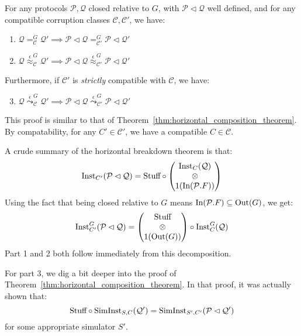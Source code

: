 \begin{theorem}
  For any protocols $\mathcal{P}, \mathcal{Q}$ closed relative to $G$, with $\mathcal{P} \lhd \mathcal{Q}$
  well defined, and for any compatible corruption classes $\mathcal{C}, \mathcal{C'}$, we have:
  \begin{enumerate}
    \item $\mathcal{Q} =^G_{\mathcal{C}} \mathcal{Q}' \implies \mathcal{P} \lhd \mathcal{Q} =^G_{\mathcal{C}'} \mathcal{P} \lhd \mathcal{Q}'$
    \item $\mathcal{Q} \overset{\epsilon}{\approx}^G_{\mathcal{C}} \mathcal{Q}' \implies \mathcal{P} \lhd \mathcal{Q} \overset{\epsilon}{\approx}^G_{\mathcal{C}'} \mathcal{P} \lhd \mathcal{Q}'$
  \end{enumerate}

  Furthermore, if $\mathcal{C}'$ is \emph{strictly} compatible with $\mathcal{C}$,
  we have:
  \begin{enumerate}
    \setcounter{enumi}{2}
    \item $\mathcal{Q} \overset{\epsilon}{\leadsto}^G_{\mathcal{C}} \mathcal{Q}' \implies \mathcal{P} \lhd \mathcal{Q} \overset{\epsilon}{\leadsto}^G_{\mathcal{C}'} \mathcal{P} \lhd \mathcal{Q}'$
  \end{enumerate}

   This proof is similar to that of Theorem~\ref{thm:horizontal_composition_theorem}.
  By compatability, for any $C' \in \mathcal{C}'$, we have a compatible $C \in \mathcal{C}$.

  A crude summary of the horizontal breakdown theorem is that:
  $$
  \text{Inst}_{C'}(\mathcal{P} \lhd \mathcal{Q})
  = \text{Stuff} \circ \begin{pmatrix}
    \text{Inst}_C(\mathcal{Q})\cr
    \otimes\cr
    1(\text{In}(\mathcal{P}.F))
  \end{pmatrix}
  $$
  Using the fact that being closed relative to $G$ means $\text{In}(\mathcal{P}.F) \subseteq \text{Out}(G)$,
  we get:
  $$
  \text{Inst}^G_{C'}(\mathcal{P} \lhd \mathcal{Q}) =
  \begin{pmatrix}
    \text{Stuff}\cr
    \otimes\cr
    1(\text{Out}(G))
  \end{pmatrix}
  \circ \text{Inst}^G_C(\mathcal{Q})
  $$
  Part 1 and 2 both follow immediately from this decomposition.

  For part 3, we dig a bit deeper into the proof of Theorem~\ref{thm:horizontal_composition_theorem}.
  In that proof, it was actually shown that:
  $$
  \text{Stuff} \circ \text{SimInst}_{S, C}(\mathcal{Q}') = \text{SimInst}_{S', C'}(\mathcal{P} \lhd \mathcal{Q}')
  $$
  for some appropriate simulator $S'$.


\end{theorem}
